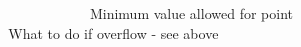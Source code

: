 ~\newline
~\newline
~\newline
~\newline
~\newline
~\newline
~\newline
~\newline
~\newline
~\newline
~\newline
~\newline
~\newline
~\newline
~\newline
~\newline
~\newline
~\newline
 Minimum value allowed for point ~\newline
~\newline
~\newline
~\newline
~\newline
~\newline
~\newline
~\newline
~\newline
~\newline
~\newline
~\newline
~\newline
~\newline
~\newline
~\newline
~\newline
~\newline
 What to do if overflow -\/ see above ~\newline
~\newline
~\newline
~\newline
~\newline
~\newline
~\newline
~\newline
~\newline
~\newline
~\newline
~\newline
~\newline
~\newline
~\newline
